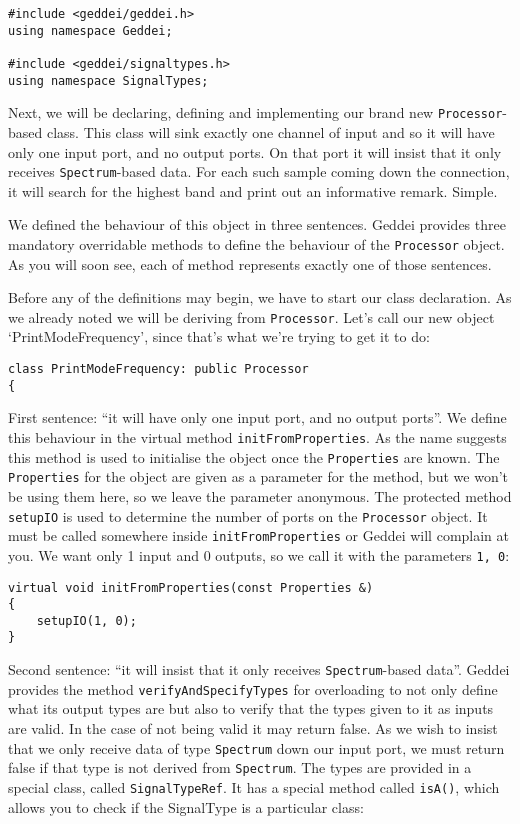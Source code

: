 \begin{verbatim}
#include <geddei/geddei.h>
using namespace Geddei;

#include <geddei/signaltypes.h>
using namespace SignalTypes;
\end{verbatim}

Next, we will be declaring, defining and implementing our brand new \texttt{Processor}-based class. This class will sink exactly one channel of input and so it will have only one input port, and no output ports. On that port it will insist that it only receives \texttt{Spectrum}-based data. For each such sample coming down the connection, it will search for the highest band and print out an informative remark. Simple.

We defined the behaviour of this object in three sentences. Geddei provides three mandatory overridable methods to define the behaviour of the \texttt{Processor} object. As you will soon see, each of method represents exactly one of those sentences.

Before any of the definitions may begin, we have to start our class declaration. As we already noted we will be deriving from \texttt{Processor}. Let's call our new object `PrintModeFrequency', since that's what we're trying to get it to do:

\begin{verbatim}
class PrintModeFrequency: public Processor
{
\end{verbatim}

First sentence: ``it will have only one input port, and no output ports''. We define this behaviour in the virtual method \texttt{initFromProperties}. As the name suggests this method is used to initialise the object once the \texttt{Properties} are known. The \texttt{Properties} for the object are given as a parameter for the method, but we won't be using them here, so we leave the parameter anonymous. The protected method \texttt{setupIO} is used to determine the number of ports on the \texttt{Processor} object. It must be called somewhere inside \texttt{initFromProperties} or Geddei will complain at you. We want only 1 input and 0 outputs, so we call it with the parameters \texttt{1, 0}:

\begin{verbatim}
virtual void initFromProperties(const Properties &)
{
    setupIO(1, 0);
}
\end{verbatim} 

Second sentence: ``it will insist that it only receives \texttt{Spectrum}-based data''. Geddei provides the method \texttt{verifyAndSpecifyTypes} for overloading to not only define what its output types are but also to verify that the types given to it as inputs are valid. In the case of not being valid it may return false. As we wish to insist that we only receive data of type \texttt{Spectrum} down our input port, we must return false if that type is not derived from \texttt{Spectrum}. The types are provided in a special class, called \texttt{SignalTypeRef}. It has a special method called \texttt{isA()}, which allows you to check if the SignalType is a particular class:

